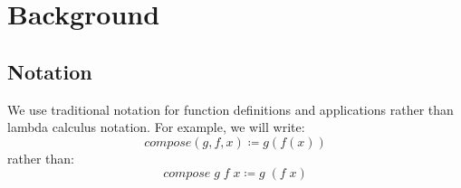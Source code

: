 \documentclass{article}
\begin{document}
% 
% 
% 
 

\section{Background}
\label{section:Background}
 
\subsection{Notation}
\label{section:Background:Notation}

We use traditional notation for function definitions and applications rather than lambda calculus notation.
For example, we will write:
\begin{equation*}
compose(g, f, x) ≔ g(f(x))
\end{equation*}
rather than:
\begin{equation*}
compose\; g\; f\; x ≔ g\; (f\; x)
\end{equation*}
\end{document}
